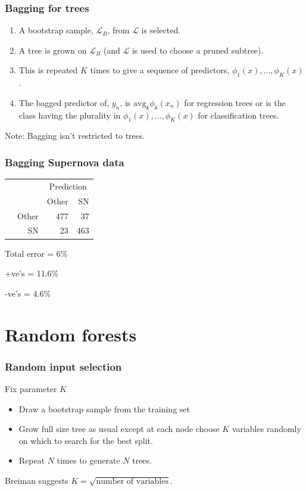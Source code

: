 \documentclass{beamer}
\begin{document}
\begin{frame}
	\frametitle{Bagging for trees}
	\begin{enumerate}
		\item A bootstrap sample, $\mathcal{L}_B$, from $\mathcal{L}$ is selected.
		\item A tree is grown on $\mathcal{L}_B$ (and $\mathcal{L}$ is used to choose a pruned subtree).
		\item This is repeated $K$ times to give a sequence of predictors, $\phi_1(x), \ldots, \phi_K(x)$.
		\item The bagged predictor of, $y_n$, is  $\text{avg}_k \phi_k(x_n)$ for regression trees or is the class having the plurality  in  $\phi_1(x), \ldots, \phi_K(x)$ for classification trees.
	\end{enumerate}
	Note: Bagging isn't restricted to trees.
\end{frame}

\begin{frame}
	\frametitle{Bagging Supernova data}
	\begin{table}
	\begin{tabular}{cr|rr}
	& & \multicolumn{2}{c}{Prediction}\\
	& & Other & SN\\
	\hline
	\multirow{2}{*}{\rotatebox{90}{Actual}} & Other &  477 &  37\\
	& SN & 23 &  463\\
	\end{tabular}
	\end{table}
		Total error = 6\%
		
		+ve's = 11.6\%
		
		-ve's = 4.6\%
\end{frame}

\section{Random forests}

\begin{frame}[fragile]
	\frametitle{Random input selection}
	Fix parameter $K$
	\begin{itemize}
		\item Draw a bootstrap sample from the training set
		\item Grow full size tree as usual except at each node choose $K$ variables randomly on which to search for the best split.
		\item Repeat $N$ times to generate $N$ trees.
	\end{itemize}
	Breiman suggests $K=\sqrt{\text{number of variables}}$.
	
\end{frame}
\end{document}
